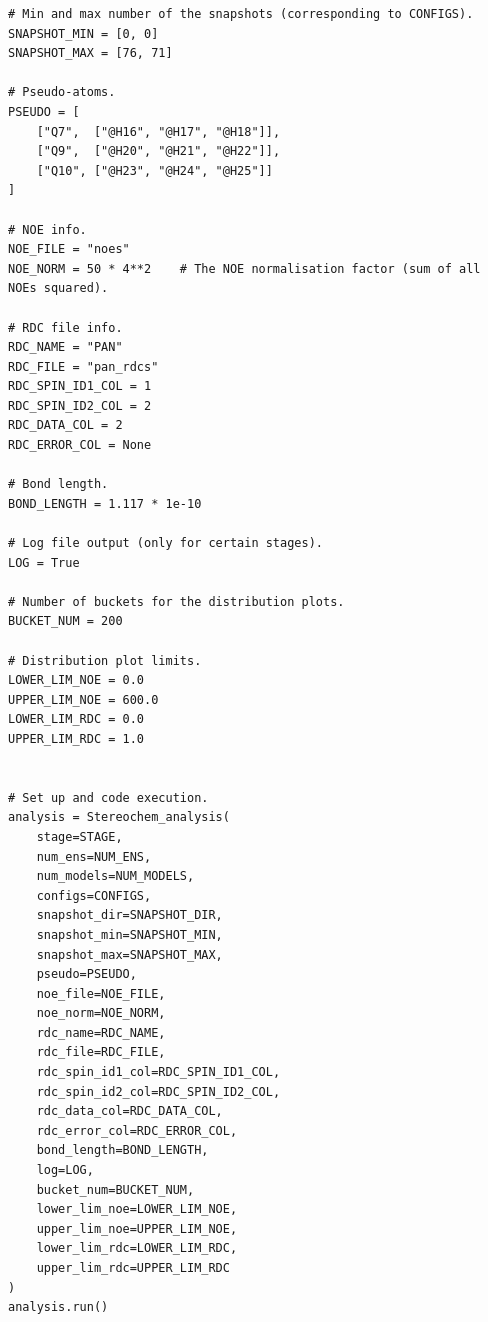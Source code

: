 \begin{lstlisting}
# Min and max number of the snapshots (corresponding to CONFIGS).
SNAPSHOT_MIN = [0, 0]
SNAPSHOT_MAX = [76, 71]

# Pseudo-atoms.
PSEUDO = [
    ["Q7",  ["@H16", "@H17", "@H18"]],
    ["Q9",  ["@H20", "@H21", "@H22"]],
    ["Q10", ["@H23", "@H24", "@H25"]]
]

# NOE info.
NOE_FILE = "noes"
NOE_NORM = 50 * 4**2    # The NOE normalisation factor (sum of all NOEs squared).

# RDC file info.
RDC_NAME = "PAN"
RDC_FILE = "pan_rdcs"
RDC_SPIN_ID1_COL = 1
RDC_SPIN_ID2_COL = 2
RDC_DATA_COL = 2
RDC_ERROR_COL = None

# Bond length.
BOND_LENGTH = 1.117 * 1e-10

# Log file output (only for certain stages).
LOG = True

# Number of buckets for the distribution plots.
BUCKET_NUM = 200

# Distribution plot limits.
LOWER_LIM_NOE = 0.0
UPPER_LIM_NOE = 600.0
LOWER_LIM_RDC = 0.0
UPPER_LIM_RDC = 1.0


# Set up and code execution.
analysis = Stereochem_analysis(
    stage=STAGE,
    num_ens=NUM_ENS,
    num_models=NUM_MODELS,
    configs=CONFIGS,
    snapshot_dir=SNAPSHOT_DIR,
    snapshot_min=SNAPSHOT_MIN,
    snapshot_max=SNAPSHOT_MAX,
    pseudo=PSEUDO,
    noe_file=NOE_FILE,
    noe_norm=NOE_NORM,
    rdc_name=RDC_NAME,
    rdc_file=RDC_FILE,
    rdc_spin_id1_col=RDC_SPIN_ID1_COL,
    rdc_spin_id2_col=RDC_SPIN_ID2_COL,
    rdc_data_col=RDC_DATA_COL,
    rdc_error_col=RDC_ERROR_COL,
    bond_length=BOND_LENGTH,
    log=LOG,
    bucket_num=BUCKET_NUM,
    lower_lim_noe=LOWER_LIM_NOE,
    upper_lim_noe=UPPER_LIM_NOE,
    lower_lim_rdc=LOWER_LIM_RDC,
    upper_lim_rdc=UPPER_LIM_RDC
)
analysis.run()
\end{lstlisting}
